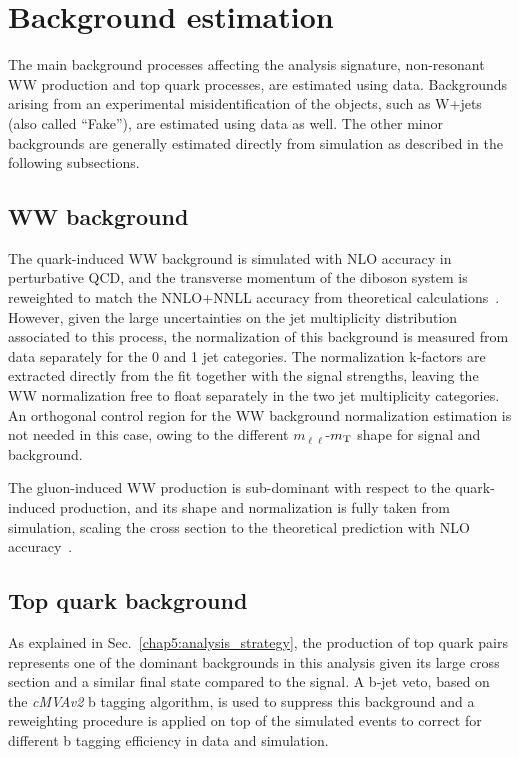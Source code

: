 \section{Background estimation}\label{chap5:backgrounds}

The main background processes affecting the analysis signature, non-resonant WW production and top quark processes, are estimated using data. Backgrounds arising from an experimental misidentification of the objects, such as W+jets (also called ``Fake''), are estimated using data as well. The other minor backgrounds are generally estimated directly from simulation as described in the following subsections.

\subsection{WW background}

The quark-induced WW background is simulated with NLO accuracy in perturbative QCD, and the transverse momentum of the diboson system is reweighted to match the NNLO+NNLL accuracy from theoretical calculations~\cite{Meade:2014fca,Jaiswal:2014yba}. However, given the large uncertainties on the jet multiplicity distribution associated to this process, the normalization of this background is measured from data separately for the 0 and 1 jet categories. The normalization k-factors are extracted directly from the fit together with the signal strengths, leaving the WW normalization free to float separately in the two jet multiplicity categories. An orthogonal control region for the WW background normalization estimation is not needed in this case, owing to the different $m_{\ell\ell}$-$m_\mathrm{T}$ shape for signal and background.

The gluon-induced WW production is sub-dominant with respect to the quark-induced production, and its shape and normalization is fully taken from simulation, scaling the cross section to the theoretical prediction with NLO accuracy~\cite{Caola:2015rqy}.

\subsection{Top quark background}

As explained in Sec.~\ref{chap5:analysis_strategy}, the production of top quark pairs represents one of the dominant backgrounds in this analysis given its large cross section and a similar final state compared to the signal. A b-jet veto, based on the \emph{cMVAv2} b tagging algorithm, is used to suppress this background and a reweighting procedure is applied on top of the simulated events to correct for different b tagging efficiency in data and simulation.

